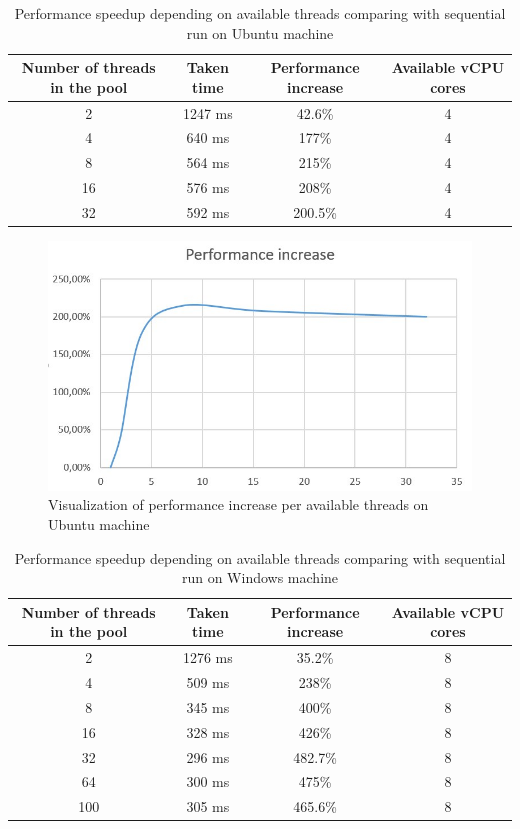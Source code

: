 \begin{table}[h]
\centering\caption{Performance speedup depending on available threads comparing with sequential run on Ubuntu machine \label{tab:comp-ubuntu}}
\begin{tabular}{|c|c|c|c|}
\hline
\textbf{Number of threads in the pool} & \textbf{Taken time} & \textbf{Performance increase} & Available vCPU cores \\
\hline
 2 & 1247 ms & 42.6\% & 4 \\
\hline
 4 & 640 ms & 177\% & 4 \\
\hline
 8 & 564 ms & 215\% & 4 \\
\hline
 16 & 576 ms & 208\% & 4 \\
\hline
 32 & 592 ms & 200.5\% & 4 \\
\hline
\end{tabular}
\end{table}

\begin{figure}[h]
\centering\includegraphics[width=.8\textwidth]{img/exp/2/ubuntu-performance-increase}
\caption{Visualization of performance increase per available threads on Ubuntu machine}  \label{img:ub-perf}
\end{figure}

\begin{table}[h]
\centering\caption{Performance speedup depending on available threads comparing with sequential run on Windows machine \label{tab:comp-windows}}
\begin{tabular}{|c|c|c|c|}
\hline
\textbf{Number of threads in the pool} & \textbf{Taken time} & \textbf{Performance increase} & Available vCPU cores \\
\hline
2 & 1276 ms & 35.2\% & 8 \\
\hline
4 & 509 ms & 238\% & 8  \\
\hline
8 & 345 ms & 400\% & 8 \\
\hline
16 & 328 ms & 426\% & 8 \\
\hline
32 & 296 ms & 482.7\% & 8 \\
\hline
64 & 300 ms & 475\% & 8 \\
\hline
100 & 305 ms & 465.6\% & 8 \\
\hline
\end{tabular}
\end{table}

